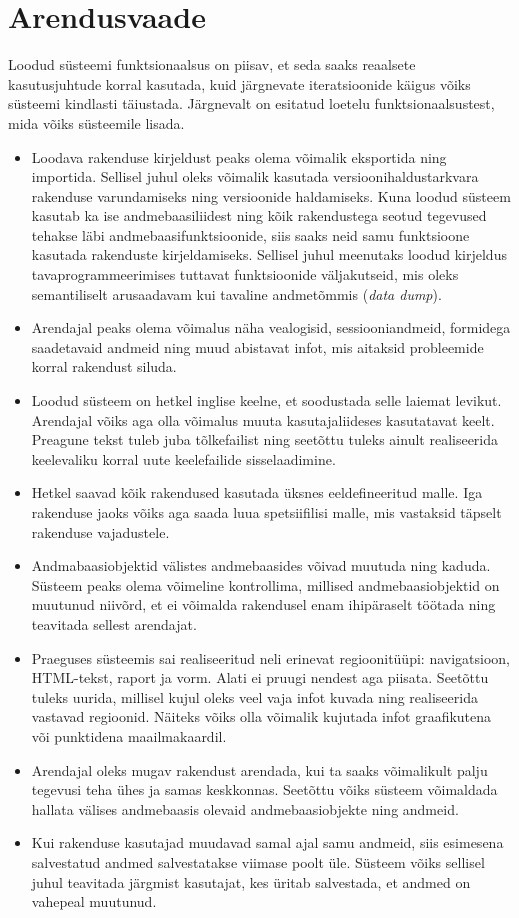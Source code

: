 \documentclass[a4paper,12pt]{article} %
\begin{document}
\section{Arendusvaade}
Loodud süsteemi funktsionaalsus on piisav, et seda saaks reaalsete kasutusjuhtude korral kasutada, kuid järgnevate iteratsioonide käigus võiks süsteemi kindlasti täiustada. Järgnevalt on esitatud loetelu funktsionaalsustest, mida võiks süsteemile lisada.
\begin{itemize}
\item Loodava rakenduse kirjeldust peaks olema võimalik eksportida ning importida. Sellisel juhul oleks võimalik kasutada versioonihaldustarkvara rakenduse varundamiseks ning versioonide haldamiseks. Kuna loodud süsteem kasutab ka ise andmebaasiliidest ning kõik rakendustega seotud tegevused tehakse läbi andmebaasifunktsioonide, siis saaks neid samu funktsioone kasutada rakenduste kirjeldamiseks. Sellisel juhul meenutaks loodud kirjeldus tavaprogrammeerimises tuttavat funktsioonide väljakutseid, mis oleks semantiliselt arusaadavam kui tavaline andmetõmmis (\textit{data dump}).
\item Arendajal peaks olema võimalus näha vealogisid, sessiooniandmeid, formidega saadetavaid andmeid ning muud abistavat infot, mis aitaksid probleemide korral rakendust siluda.
\item Loodud süsteem on hetkel inglise keelne, et soodustada selle laiemat levikut. Arendajal võiks aga olla võimalus muuta kasutajaliideses kasutatavat keelt. Preagune tekst tuleb juba tõlkefailist ning seetõttu tuleks ainult realiseerida keelevaliku korral uute keelefailide sisselaadimine.
\item Hetkel saavad kõik rakendused kasutada üksnes eeldefineeritud malle. Iga rakenduse jaoks võiks aga saada luua spetsiifilisi malle, mis vastaksid täpselt rakenduse vajadustele.
\item Andmabaasiobjektid välistes andmebaasides võivad muutuda ning kaduda. Süsteem peaks olema võimeline kontrollima, millised andmebaasiobjektid on muutunud niivõrd, et ei võimalda rakendusel enam ihipäraselt töötada ning teavitada sellest arendajat.
\item Praeguses süsteemis sai realiseeritud neli erinevat regioonitüüpi: navigatsioon, HTML-tekst, raport ja vorm. Alati ei pruugi nendest aga piisata. Seetõttu tuleks uurida, millisel kujul oleks veel vaja infot kuvada ning realiseerida vastavad regioonid. Näiteks võiks olla võimalik kujutada infot graafikutena või punktidena maailmakaardil.
\item Arendajal oleks mugav rakendust arendada, kui ta saaks võimalikult palju tegevusi teha ühes ja samas keskkonnas. Seetõttu võiks süsteem võimaldada hallata välises andmebaasis olevaid andmebaasiobjekte ning andmeid.
\item Kui rakenduse kasutajad muudavad samal ajal samu andmeid, siis esimesena salvestatud andmed salvestatakse viimase poolt üle. Süsteem võiks sellisel juhul teavitada järgmist kasutajat, kes üritab salvestada, et andmed on vahepeal muutunud.
\end{itemize}
\end{document}
